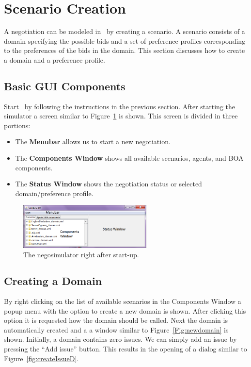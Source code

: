 \documentclass[]{article}
\begin{document}
\section{Scenario Creation}
A negotiation can be modeled in \Genius~by creating a scenario. A scenario consists of a domain specifying the possible bids and a set of preference profiles corresponding to the preferences of the bids in the domain. This section discusses how to create a domain and a preference profile.

\subsection{Basic GUI Components}
Start \Genius~by following the instructions in the previous section. After starting the simulator a screen similar to Figure~\ref{Fig:negosimulator start} is shown. This screen is divided in three portions:

\begin{itemize}
	\item The \textbf{Menubar} allows us to start a new negotiation.
	\item The \textbf{Components Window} shows all available scenarios, agents, and BOA components.
	\item The \textbf{Status Window} shows the negotiation status or selected domain/preference profile.
\end{itemize}

\begin{figure}[htb]
	\centering
	\includegraphics[width=0.6\textwidth]{media/image6.png}
\caption{The negosimulator right after start-up.}\label{Fig:negosimulator start}
\end{figure}

\subsection{Creating a Domain}
By right clicking on the list of available scenarios in the Components Window a popup menu with the option to create a new domain is shown. After clicking this option it is requested how the domain should be called. Next the domain is automatically created and a a window similar to Figure~\ref{Fig:newdomain} is shown. Initially, a domain contains zero issues. We can simply add an issue by pressing the ``Add issue'' button. This results in the opening of a dialog similar to Figure~\ref{fig:createIssueD}.
\end{document}
